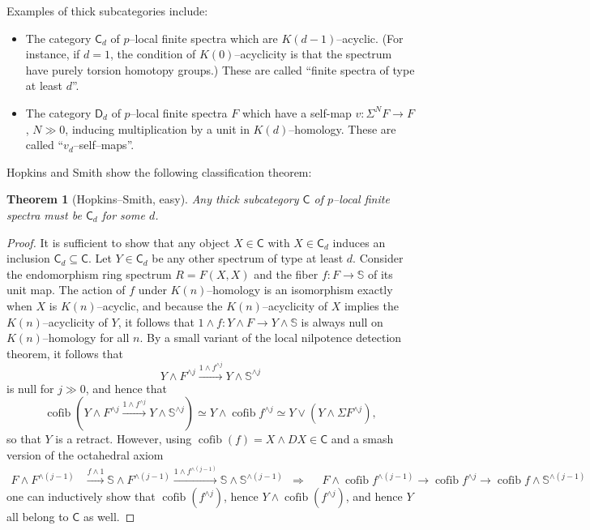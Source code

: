 \documentclass{amsart}
\renewcommand{\S}{\mathbb S}
\newcommand{\<}{\langle}
\renewcommand{\>}{\rangle}
\newcommand{\sm}{\wedge}
\newcommand{\Susp}{\Sigma}
\newcommand{\CatOf}[1]{\mathsf{#1}}
\theoremstyle{plain}
\newtheorem*{theorem}{Theorem}
\theoremstyle{definition}
\theoremstyle{remark}
\begin{document}
\noindent Examples of thick subcategories include:
\begin{itemize}
\item The category $\CatOf{C}_d$ of $p$--local finite spectra which are $K(d-1)$--acyclic.  (For instance, if $d = 1$, the condition of $K(0)$--acyclicity is that the spectrum have purely torsion homotopy groups.)  These are called ``finite spectra of type at least $d$''.
\item The category $\CatOf{D}_d$ of $p$--local finite spectra $F$ which have a self-map $v: \Susp^N F \to F$, $N \gg 0$, inducing multiplication by a unit in $K(d)$--homology.  These are called ``$v_d$--self--maps''.
\end{itemize}
Hopkins and Smith show the following classification theorem:

\begin{theorem}[Hopkins--Smith, easy]
Any thick subcategory $\CatOf C$ of $p$--local finite spectra must be $\CatOf C_d$ for some $d$.
\end{theorem}
\begin{proof}
It is sufficient to show that any object $X \in \CatOf C$ with $X \in \CatOf C_d$ induces an inclusion $\CatOf C_d \subseteq \CatOf C$.  Let $Y \in \CatOf C_d$ be any other spectrum of type at least $d$.  Consider the endomorphism ring spectrum $R = F(X, X)$ and the fiber $f: F \to \S$ of its unit map.  The action of $f$ under $K(n)$--homology is an isomorphism exactly when $X$ is $K(n)$--acyclic, and because the $K(n)$--acyclicity of $X$ implies the $K(n)$--acyclicity of $Y$, it follows that $1 \sm f: Y \sm F \to Y \sm \S$ is always null on $K(n)$--homology for all $n$.  By a small variant of the local nilpotence detection theorem, it follows that \[Y \sm F^{\sm j} \xrightarrow{1 \sm f^{\sm j}} Y \sm \S^{\sm j}\] is null for $j \gg 0$, and hence that \[\operatorname{cofib}\left( Y \sm F^{\sm j} \xrightarrow{1 \sm f^{\sm j}} Y \sm \S^{\sm j} \right) \simeq Y \sm \operatorname{cofib} f^{\sm j} \simeq Y \vee (Y \sm \Susp F^{\sm j}),\] so that $Y$ is a retract.  However, using $\operatorname{cofib}(f) = X \sm DX \in \CatOf C$ and a smash version of the octahedral axiom
\begin{align*}
F \sm F^{\sm (j-1)} & \xrightarrow{f \sm 1} \S \sm F^{\sm (j-1)} \xrightarrow{1 \sm f^{\sm (j-1)}} \S \sm \S^{\sm (j-1)} & \Rightarrow & &  F \sm \operatorname{cofib} f^{\sm (j-1)} \to \operatorname{cofib} f^{\sm j} \to \operatorname{cofib} f \sm \S^{\sm (j-1)}
\end{align*}
one can inductively show that $\operatorname{cofib}(f^{\sm j})$, hence $Y \sm \operatorname{cofib}(f^{\sm j})$, and hence $Y$ all belong to $\CatOf C$ as well.
\end{proof}
\end{document}
